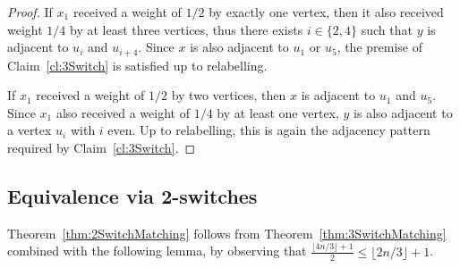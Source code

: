 \documentclass[11pt,a4paper]{article}
\theoremstyle{definition}
\begin{document}
\begin{proof}
  If $x_1$ received a weight of $1/2$ by exactly one vertex, then it also
  received weight $1/4$ by at least three vertices, thus there exists
  $i \in \{2,4\}$ such that $y$ is adjacent to $u_{i}$ and $u_{i+4}$. Since $x$
  is also adjacent to $u_1$ or $u_5$, the premise of Claim~\ref{cl:3Switch}
  is satisfied up to relabelling.

  If $x_1$ received a weight of $1/2$ by two vertices, then $x$ is adjacent to
  $u_1$ and $u_5$. Since $x_1$ also received a weight of $1/4$ by at least one
  vertex, $y$ is also adjacent to a vertex $u_i$ with $i$ even. Up to
  relabelling, this is again the adjacency pattern required by
  Claim~\ref{cl:3Switch}.
\end{proof}


\subsection{Equivalence via 2-switches}\label{ssec:2switch}
Theorem~\ref{thm:2SwitchMatching} follows from Theorem~\ref{thm:3SwitchMatching} combined with
the following lemma, by observing that $\frac{\lfloor 4n/3\rfloor+1}2 \le \lfloor 2n/3\rfloor+1$.
\end{document}
